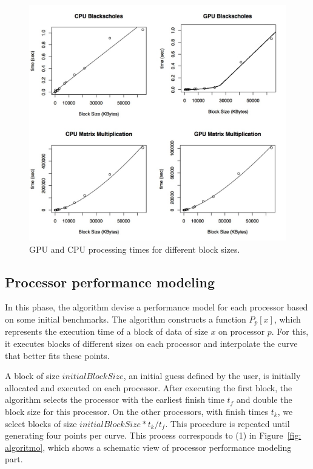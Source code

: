 \documentclass[journal]{IEEEtran}
\begin{document}
\begin{figure}[!t]
	\centering
			\includegraphics[scale=0.29]{CPUVersusGPULinear2_Ajustado.pdf} 				
	\caption{GPU and CPU processing times for different block sizes.}
	\label{fig: CPUVersusGPU1}
\end{figure}


\subsection{Processor performance modeling}

In this phase, the algorithm devise a performance model for each processor based on some initial benchmarks. The algorithm 
constructs a function $P_p[x]$, which represents the execution time of a block
of data of size $x$ on processor $p$. For this, it executes blocks of different
sizes on each processor and interpolate the curve that better fits these points.

A block of size $initialBlockSize$, an initial guess defined by the user, is initially allocated
and executed on each processor. After executing the first block, the algorithm
selects the processor with the earliest finish time $t_f$ and double the block
size for this processor. On the other processors, with finish times $t_k$, we
select blocks of size $initialBlockSize * t_k / t_f$. This procedure is repeated
until generating four points per curve. This process corresponds to (1) in
Figure~\ref{fig: algoritmo}, which shows a schematic view of processor
performance modeling part.
\end{document}
